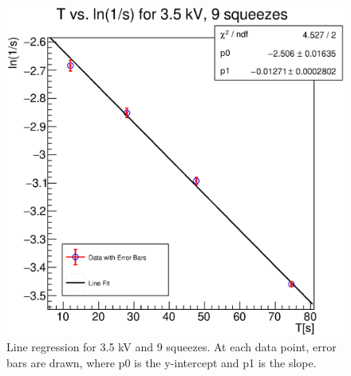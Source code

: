 \documentclass[reprint,amsmath,aps,nofootinbib,english]{revtex4-2}
\begin{document}
\begin{figure}[H]
  \includegraphics[width=0.95\columnwidth]{graphics/35_9.eps}
  \caption{Line regression for 3.5 kV and 9 squeezes. At each data point, error bars are drawn, where p0 is the y-intercept and p1 is the slope.}
\end{figure}
\end{document}
